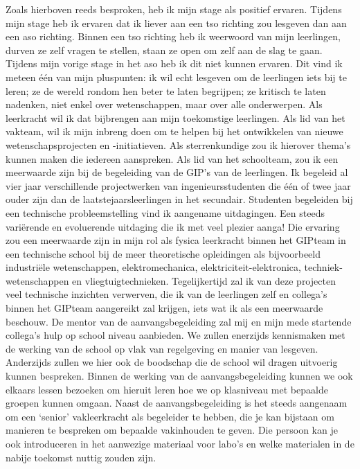 \documentclass[a4paper,12pt,twoside]{article}%
\begin{document}
Zoals hierboven reeds besproken, heb ik mijn stage als positief ervaren. Tijdens mijn stage heb ik ervaren dat ik liever aan een tso richting zou lesgeven dan aan een aso richting. Binnen een tso richting heb ik weerwoord van mijn leerlingen, durven ze zelf vragen te stellen, staan ze open om zelf aan de slag te gaan. Tijdens mijn vorige stage in het aso heb ik dit niet kunnen ervaren.\newline\newline
Dit vind ik meteen één van mijn pluspunten: ik wil echt lesgeven om de leerlingen iets bij te leren; ze de wereld rondom hen beter te laten begrijpen; ze kritisch te laten nadenken, niet enkel over wetenschappen, maar over alle onderwerpen. Als leerkracht wil ik dat bijbrengen aan mijn toekomstige leerlingen. \newline
Als lid van het vakteam, wil ik mijn inbreng doen om te helpen bij het ontwikkelen van nieuwe wetenschapsprojecten en -initiatieven. Als sterrenkundige zou ik hierover thema's kunnen maken die iedereen aanspreken. Als lid van het schoolteam, zou ik een meerwaarde zijn bij de begeleiding van de GIP's van de leerlingen. Ik begeleid al vier jaar verschillende projectwerken van ingenieursstudenten die één of twee jaar ouder zijn dan de laatstejaarsleerlingen in het secundair. Studenten begeleiden bij een technische probleemstelling vind ik aangename uitdagingen. Een steeds variërende en evoluerende uitdaging die ik met veel plezier aanga! Die ervaring zou een meerwaarde zijn in mijn rol als fysica leerkracht binnen het GIPteam in een technische school bij de meer theoretische opleidingen als bijvoorbeeld industriële wetenschappen, elektromechanica, elektriciteit-elektronica, techniek-wetenschappen en vliegtuigtechnieken. Tegelijkertijd zal ik van deze projecten veel technische inzichten verwerven, die ik van de leerlingen zelf en collega's binnen het GIPteam aangereikt zal krijgen, iets wat ik als een meerwaarde beschouw.\newline\newline
De mentor van de aanvangsbegeleiding zal mij en mijn mede startende collega's hulp op school niveau aanbieden. We zullen enerzijds kennismaken met de werking van de school op vlak van regelgeving en manier van lesgeven. Anderzijds zullen we hier ook de boodschap die de school wil dragen uitvoerig kunnen bespreken. Binnen de werking van de  aanvangsbegeleiding kunnen we ook elkaars lessen bezoeken om hieruit leren hoe we op klasniveau met bepaalde groepen kunnen omgaan. Naast de aanvangsbegeleiding is het steeds aangenaam om een `senior' vakleerkracht als begeleider te hebben, die je kan bijstaan om manieren te bespreken om bepaalde vakinhouden te geven. Die persoon kan je ook introduceren in het aanwezige materiaal voor labo's en welke materialen in de nabije toekomst nuttig zouden zijn.\newline\newline
\end{document}
